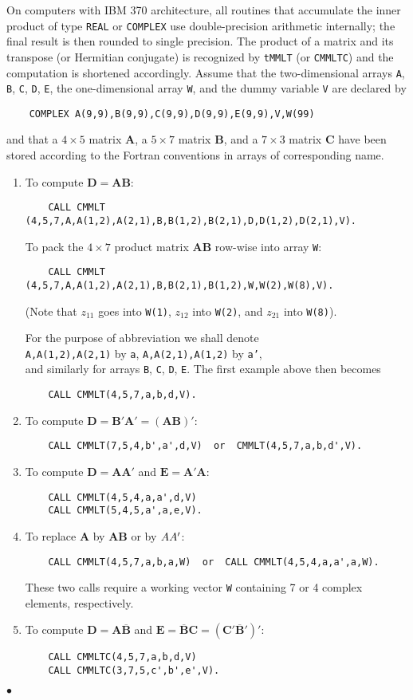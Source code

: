 \Accuracy
On computers with IBM 370 architecture, all routines that
accumulate the inner product of type {\tt REAL} or {\tt COMPLEX} use
double-precision arithmetic internally;
the final result is then rounded to single precision.
\Notes
The product of a matrix and its transpose (or Hermitian conjugate)
is recognized by {\tt tMMLT} (or {\tt CMMLTC}) and the computation is
shortened accordingly.
\Examples
Assume that the two-dimensional arrays {\tt A}, {\tt B}, {\tt C},
{\tt D}, {\tt E}, the one-dimensional array {\tt W}, and the dummy
variable {\tt V} are declared by
\begin{verbatim}
    COMPLEX A(9,9),B(9,9),C(9,9),D(9,9),E(9,9),V,W(99)
\end{verbatim}
and that a $4\times5$ matrix {\bf A}, a $5\times7$ matrix {\bf B},
and a $7\times3$ matrix {\bf C} have been stored according to the
Fortran conventions in arrays of corresponding name.
\begin{enumerate}
\item To compute $\mathbf{D=AB}$:
\begin{verbatim}
    CALL CMMLT (4,5,7,A,A(1,2),A(2,1),B,B(1,2),B(2,1),D,D(1,2),D(2,1),V).
    \end{verbatim}
To pack the $4\times7$ product matrix \textbf{AB} row-wise into array
{\tt W}:
\begin{verbatim}
    CALL CMMLT (4,5,7,A,A(1,2),A(2,1),B,B(2,1),B(1,2),W,W(2),W(8),V).
\end{verbatim}
(Note that $z_{11}$ goes into {\tt W(1)}, $z_{12}$ into {\tt W(2)},
and $z_{21}$ into {\tt W(8)}).
\par
For the purpose of abbreviation we shall denote \\
{\tt A,A(1,2),A(2,1)} by {\tt a}, \quad
{\tt A,A(2,1),A(1,2)} by {\tt a'}, \\
and similarly for arrays {\tt B}, {\tt C}, {\tt D}, {\tt E}. The first
example above then becomes
\begin{verbatim}
    CALL CMMLT(4,5,7,a,b,d,V).
\end{verbatim}
\item To compute $\mathbf{D=B'A'=(AB)'}$:
\begin{verbatim}
    CALL CMMLT(7,5,4,b',a',d,V)  or  CMMLT(4,5,7,a,b,d',V).
\end{verbatim}
\item To compute $\mathbf{D=AA'}$ and $\mathbf{E=A'A}$:
\begin{verbatim}
    CALL CMMLT(4,5,4,a,a',d,V)
    CALL CMMLT(5,4,5,a',a,e,V).
\end{verbatim}
\item To replace {\bf A} by {\bf AB} or by ${\bf AA'}$:
\begin{verbatim}
    CALL CMMLT(4,5,7,a,b,a,W)  or  CALL CMMLT(4,5,4,a,a',a,W).
\end{verbatim}
These two calls require a working vector {\tt W} containing 7 or 4
complex elements, respectively.
\item To compute $\mathbf{D=A\overline{B}}$ and
$\mathbf{E=\overline{B}C=(C'\overline{B}')'}$:
\begin{verbatim}
    CALL CMMLTC(4,5,7,a,b,d,V)
    CALL CMMLTC(3,7,5,c',b',e',V).
\end{verbatim}
\end{enumerate}
$\bullet$
